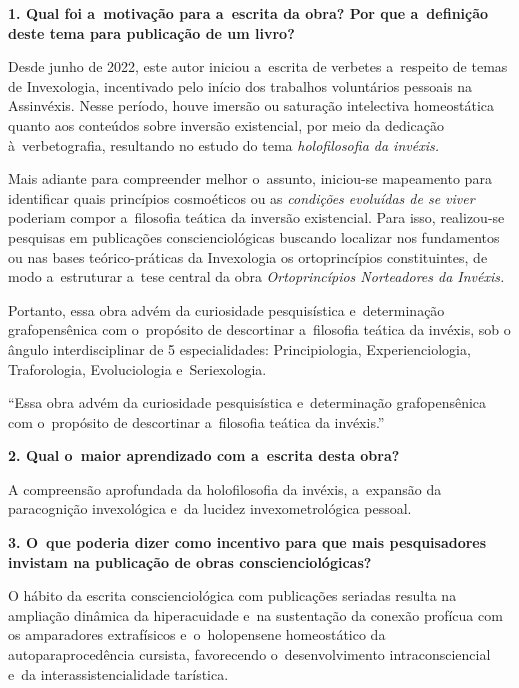 \documentclass{gescons}
\begin{document}
    \begin{multicols}{2}



\textbf{1. Qual foi a~motivação para a~escrita da obra? Por que a~definição deste tema para publicação de um livro?}

Desde junho de 2022, este autor iniciou a~escrita de verbetes a~respeito de temas de Invexologia, incentivado pelo início dos trabalhos voluntários pessoais na Assinvéxis. Nesse período, houve imersão ou saturação intelectiva homeostática quanto aos conteúdos sobre inversão existencial, por meio da dedicação à~verbetografia, resultando no estudo do tema \textit{holofilosofia da invéxis.}

Mais adiante para compreender melhor o~assunto, iniciou-se mapeamento para identificar quais princípios cosmoéticos ou as \textit{condições evoluídas de se viver} poderiam compor a~filosofia teática da inversão existencial. Para isso, realizou-se pesquisas em publicações conscienciológicas buscando localizar nos fundamentos ou nas bases teórico-práticas da Invexologia os ortoprincípios constituintes, de modo a~estruturar a~tese central da obra \textit{Ortoprincípios Norteadores da Invéxis.}

Portanto, essa obra advém da curiosidade pesquisística e~determinação grafopensênica com o~propósito de descortinar a~filosofia teática da invéxis, sob 
o ângulo interdisciplinar de 5 especialidades: Principiologia, Experienciologia, Traforologia, Evoluciologia e~Seriexologia.

\begin{pullquote}
``Essa obra advém da curiosidade pesquisística e~determinação grafopensênica com o~propósito de descortinar a~filosofia teática da invéxis.''    
\end{pullquote}




\textbf{2. Qual o~maior aprendizado com a~escrita desta obra?}

A compreensão aprofundada da holofilosofia da invéxis, a~expansão da paracognição invexológica e~da lucidez invexometrológica pessoal.

\textbf{3. O~que poderia dizer como incentivo para que mais pesquisadores invistam na publicação de obras conscienciológicas?}

O hábito da escrita conscienciológica com publicações seriadas resulta na ampliação dinâmica da hiperacuidade e~na sustentação da conexão profícua com os amparadores extrafísicos e~o~holopensene homeostático da autoparaprocedência cursista, favorecendo o~desenvolvimento intraconsciencial e~da interassistencialidade tarística.


    
    
    \end{multicols}
\end{document}
